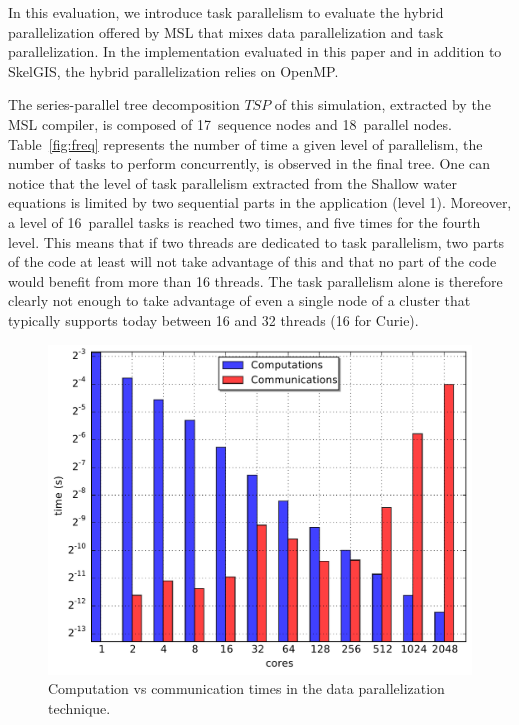 In this evaluation, we introduce task parallelism to evaluate the hybrid parallelization offered by MSL that mixes data parallelization and task parallelization.
In the implementation evaluated in this paper and in addition to SkelGIS, the hybrid parallelization relies on OpenMP.

The series-parallel tree decomposition $TSP$ of this simulation, extracted by the MSL compiler, is composed of 17~sequence nodes and 18~parallel nodes. Table~\ref{fig:freq} represents the number of time a given level of parallelism, \ie the number of tasks to perform concurrently, is observed in the final tree. One can notice that the level of task parallelism extracted from the Shallow water equations is limited by two sequential parts in the application (level 1). Moreover, a level of 16~parallel tasks is reached two times, and five times for the fourth level.
This means that if two threads are dedicated to task parallelism, two parts of the code at least will not take advantage of this and that no part of the code would benefit from more than 16 threads.
The task parallelism alone is therefore clearly not enough to take advantage of even a single node of a cluster that typically supports today between 16 and 32 threads (16 for Curie).

\begin{figure}[bh]\begin{center}
  \includegraphics[width=.6\textwidth]{../IJPP/results/task_scaling/500_200/analytic/times.pdf}
  \caption{Computation vs communication times in the data parallelization technique.}
  \label{fig:limit}
\end{center}\end{figure}

